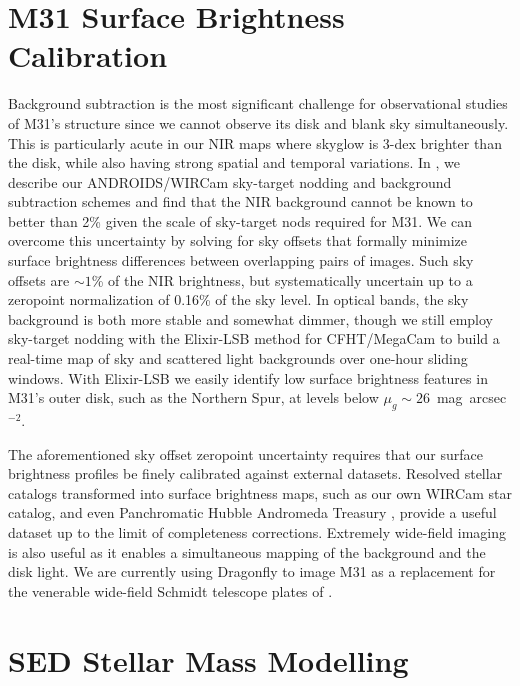 \documentclass{iau}
\begin{document}
\section{M31 Surface Brightness Calibration}

Background subtraction is the most significant challenge for observational studies of M31's structure since we cannot observe its disk and blank sky simultaneously.
This is particularly acute in our NIR maps where skyglow is 3-dex brighter than the disk, while also having strong spatial and temporal variations.
In \cite{Sick:2014}, we describe our ANDROIDS/WIRCam sky-target nodding and background subtraction schemes and find that the NIR background cannot be known to better than 2\% given the scale of sky-target nods required for M31.
We can overcome this uncertainty by solving for sky offsets that formally minimize surface brightness differences between overlapping pairs of images.
Such sky offsets are $\sim1$\% of the NIR brightness, but systematically uncertain up to a zeropoint normalization of 0.16\% of the sky level.
In optical bands, the sky background is both more stable and somewhat dimmer, though we still employ sky-target nodding with the Elixir-LSB method for CFHT/MegaCam to build a real-time map of sky and scattered light backgrounds over one-hour sliding windows.
With Elixir-LSB we easily identify low surface brightness features in M31's outer disk, such as the Northern Spur, at levels below $\mu_g\sim26$~mag~arcsec$^{-2}$.

The aforementioned sky offset zeropoint uncertainty requires that our surface brightness profiles be finely calibrated against external datasets. Resolved stellar catalogs transformed into surface brightness maps, such as our own WIRCam star catalog, and even Panchromatic Hubble Andromeda Treasury \citep[PHAT;][]{Dalcanton:2012}, provide a useful dataset up to the limit of completeness corrections. Extremely wide-field imaging is also useful as it enables a simultaneous mapping of the background and the disk light.  We are currently using Dragonfly \citep{Abraham:2014} to image M31 as a replacement for the venerable wide-field Schmidt telescope plates of \cite{Walterbos:1987}.

\section{SED Stellar Mass Modelling}
\end{document}
